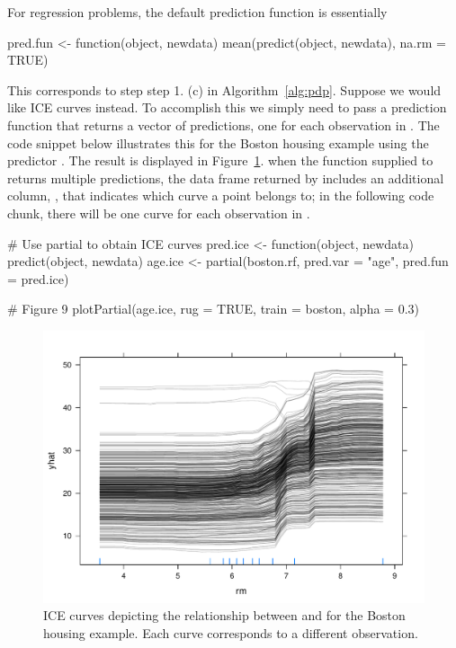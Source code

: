 For regression problems, the default prediction function is essentially
\begin{example}
pred.fun <- function(object, newdata) {
  mean(predict(object, newdata), na.rm = TRUE)
}
\end{example}
This corresponds to step step 1. (c) in Algorithm~\ref{alg:pdp}. Suppose we would like ICE curves instead. To accomplish this we simply need to pass a prediction function that returns a vector of predictions, one for each observation in . The code snippet below illustrates this for the Boston housing example using the predictor . The result is displayed in Figure~\ref{fig:ice_boston}.  when the function supplied to  returns multiple predictions, the data frame returned by  includes an additional column, , that indicates which curve a point belongs to; in the following code chunk, there will be one curve for each observation in .
\begin{example}
# Use partial to obtain ICE curves
pred.ice <- function(object, newdata) predict(object, newdata)
age.ice <- partial(boston.rf, pred.var = "age", pred.fun = pred.ice)

# Figure 9
plotPartial(age.ice, rug = TRUE, train = boston, alpha = 0.3)
\end{example}
\begin{figure}[!htbp]
  \centering
  \includegraphics[width=0.8\linewidth]{ice_boston}
  \caption{ICE curves depicting the relationship between  and  for the Boston housing example. Each curve corresponds to a different observation.}
  \label{fig:ice_boston}
\end{figure}

